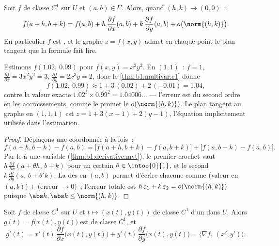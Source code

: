\begin{theorem}\label{thm:b1:multivar:c1}
Soit $f$ de classe $C^1$ sur $U$ et $(a,b) \in U$. Alors, quand
$(h, k) \to (0,0)$~:
\[
f(a + h, b + k) = f(a, b)
+ h\,\frac{\partial f}{\partial x}(a,b)
+ k\,\frac{\partial f}{\partial y}(a,b)
+ o\bigl(\norm{(h,k)}\bigr) .
\]
En particulier $f$ est , et le graphe $z = f(x,y)$ admet en
chaque point le plan tangent que la formule fait lire.
\end{theorem}

\begin{example}
\label{ex:b1:multivar:linapprox}
Estimons $f(1.02,\ 0.99)$ pour $f(x, y) = x^3y^2$. En $(1, 1)$~:
$f = 1$, $\frac{\partial f}{\partial x} = 3x^2y^2 = 3$,
$\frac{\partial f}{\partial y} = 2x^3y = 2$, donc
le \cref{thm:b1:multivar:c1} donne
\[
f(1.02,\ 0.99) \approx 1 + 3\,(0.02) + 2\,(-0.01) = 1.04 ,
\]
contre la valeur exacte $1.02^3 \times 0.99^2 = 1.04006\dots$ ---
l'erreur est du second ordre en les accroissements, comme le
promet le $o(\norm{(h,k)})$. Le plan tangent au graphe en
$(1, 1, 1)$ est $z = 1 + 3(x - 1) + 2(y - 1)$, l'équation
implicitement utilisée dans l'estimation.
\end{example}

\begin{proof}
Déplaçons une coordonnée à la fois~:
\[
f(a+h, b+k) - f(a,b)
= \bigl[f(a+h, b+k) - f(a, b+k)\bigr] + \bigl[f(a, b+k) -
f(a,b)\bigr].
\]
Par le  à une variable
(\cref{thm:b1:derivative:mvt}), le premier crochet vaut $h\,
\frac{\partial f}{\partial x}(a + \theta h,\, b + k)$ pour un
certain $\theta \in \intoo{0}{1}$, et le second $k\,\frac{\partial
f}{\partial y}(a,\, b + \theta' k)$. La  des  en $(a,b)$ permet d'écrire chacune comme (valeur en
$(a,b)$) $+$ (erreur $\to 0$)~; l'erreur totale est
$h\,\varepsilon_1 + k\,\varepsilon_2 = o(\norm{(h,k)})$ puisque
$\abs h, \abs k \leq \norm{(h,k)}$.
\end{proof}

\begin{theorem}\label{thm:b1:multivar:chain}
Soit $f$ de classe $C^1$ sur $U$ et $t \mapsto (x(t), y(t))$ de
classe $C^1$ d'un  dans $U$. Alors $g(t) =
f\bigl(x(t), y(t)\bigr)$ est de classe
$C^1$, et
\[
g'(t) = x'(t)\,\frac{\partial f}{\partial x}\bigl(x(t),y(t)\bigr)
+ y'(t)\,\frac{\partial f}{\partial y}\bigl(x(t),y(t)\bigr)
= \bigl\langle \nabla f,\ (x', y')\bigr\rangle .
\]
\end{theorem}

